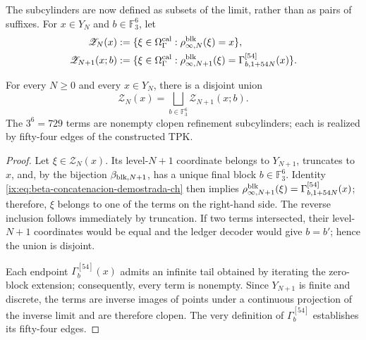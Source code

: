 The subcylinders are now defined as subsets of the limit, rather than as pairs
of suffixes. For \(x\in Y_N\) and \(b\in\mathbb F_3^6\), let
\begin{align}
 \mathscr Z_N(x)
   &:=\{\xi\in\Omega_\Gamma^{\rm cal}:
       \rho^{\rm blk}_{\infty,N}(\xi)=x\},
 \label{ix:eq:cilindro-real-limite-ch}\\
 \mathscr Z_{N+1}(x;b)
   &:=\{\xi\in\Omega_\Gamma^{\rm cal}:
       \rho^{\rm blk}_{\infty,N+1}(\xi)
       =\Gamma_{b,1+54N}^{[54]}(x)\}.
 \label{ix:eq:subcilindro-real-limite-ch}
\end{align}

\begin{theorem}
\label{ix:thm:particion-729-subcilindros-ch}
For every \(N\ge0\) and every \(x\in Y_N\), there is a disjoint union
\begin{equation}
 \mathscr Z_N(x)=
 \bigsqcup_{b\in\mathbb F_3^6}\mathscr Z_{N+1}(x;b).
 \label{ix:eq:particion-real-729-ch}
\end{equation}
The \(3^6=729\) terms are nonempty clopen refinement subcylinders; each is
realized by fifty-four edges of the constructed TPK.
\end{theorem}

\begin{proof}
Let \(\xi\in\mathscr Z_N(x)\). Its level-\(N+1\) coordinate belongs to
\(Y_{N+1}\), truncates to \(x\), and, by the bijection
\(\beta_{{\rm blk},N+1}\), has a unique final block
\(b\in\mathbb F_3^6\). Identity
\eqref{ix:eq:beta-concatenacion-demostrada-ch} then implies
\(\rho^{\rm blk}_{\infty,N+1}(\xi)
=\Gamma_{b,1+54N}^{[54]}(x)\); therefore, \(\xi\) belongs to one of the terms
on the right-hand side. The reverse inclusion follows immediately by
truncation. If two terms intersected, their level-\(N+1\) coordinates would
be equal and the ledger decoder would give \(b=b'\); hence the union is
disjoint.

Each endpoint \(\Gamma_b^{[54]}(x)\) admits an infinite tail obtained by
iterating the zero-block extension; consequently, every term is nonempty.
Since \(Y_{N+1}\) is finite and discrete, the terms are inverse images of
points under a continuous projection of the inverse limit and are therefore
clopen. The very definition of \(\Gamma_b^{[54]}\) establishes its
fifty-four edges.
\end{proof}

